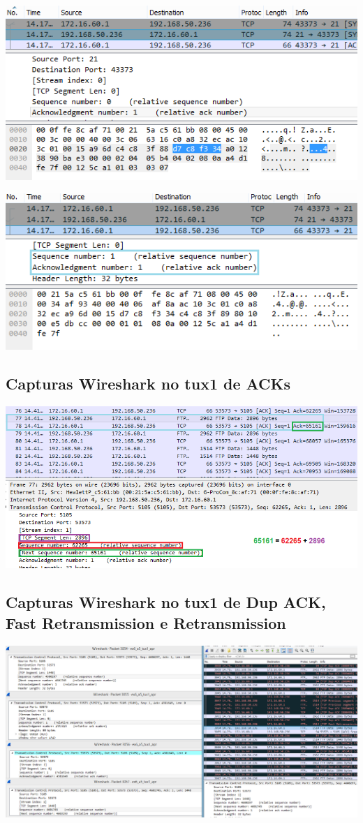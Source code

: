 \documentclass[11pt,a4paper,reqno]{report}
\numberwithin{equation}{section}
\begin{document}
\begin{appendices}
\includegraphics[width=16cm]{ex6_handshake2.png}

\includegraphics[width=16cm]{ex6_handshake3.png}

\subsection{Capturas Wireshark no tux1 de ACKs}
\label{ex6_acks}
\includegraphics[width=16cm]{ex6_arq.png}

\subsection{Capturas Wireshark no tux1 de Dup ACK, Fast Retransmission e Retransmission}
\label{ex6_retrans}
\includegraphics[width=16cm]{ex6_tux1_3054.png}


\end{appendices}
\end{document}
